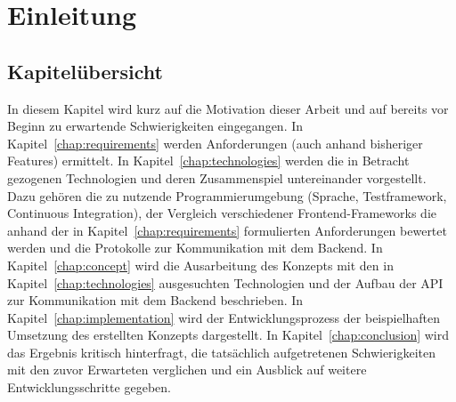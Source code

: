 \chapter{Einleitung}\label{chap:introduction}

\section{Kapitelübersicht}
In diesem Kapitel wird kurz auf die Motivation dieser Arbeit und auf bereits vor Beginn zu erwartende Schwierigkeiten eingegangen.
In Kapitel~\ref{chap:requirements} werden Anforderungen (auch anhand bisheriger Features) ermittelt.
In Kapitel~\ref{chap:technologies} werden die in Betracht gezogenen Technologien und deren Zusammenspiel untereinander vorgestellt. Dazu gehören die zu nutzende Programmierumgebung (Sprache, Testframework, Continuous Integration), der Vergleich verschiedener Frontend-Frameworks die anhand der in Kapitel~\ref{chap:requirements} formulierten Anforderungen bewertet werden und die Protokolle zur Kommunikation mit dem Backend.
In Kapitel~\ref{chap:concept} wird die Ausarbeitung des Konzepts mit den in Kapitel~\ref{chap:technologies} ausgesuchten Technologien und der Aufbau der API zur Kommunikation mit dem Backend beschrieben.
In Kapitel~\ref{chap:implementation} wird der Entwicklungsprozess der beispielhaften Umsetzung des erstellten Konzepts dargestellt.
In Kapitel~\ref{chap:conclusion} wird das Ergebnis kritisch hinterfragt, die tatsächlich aufgetretenen Schwierigkeiten mit den zuvor Erwarteten verglichen und ein Ausblick auf weitere Entwicklungsschritte gegeben.

